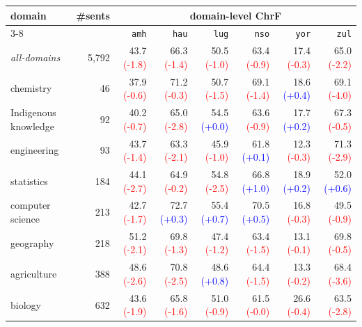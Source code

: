 \begin{table}[t]
\centering
\small
\setlength{\tabcolsep}{4pt}
\renewcommand{\arraystretch}{1.05}
\begin{tabular}{lrrrrrrr}
\toprule
\textbf{domain} & \textbf{\#sents} & \multicolumn{6}{c}{\textbf{domain-level ChrF}} \\
\cmidrule(lr){3-8}
  &       & \texttt{amh} & \texttt{hau} & \texttt{lug} & \texttt{nso} & \texttt{yor} & \texttt{zul} \\
\midrule
\textit{all-domains} & 5{,}792 & 43.7 \textcolor{red}{(-1.8)} & 66.3 \textcolor{red}{(-1.4)} & 50.5 \textcolor{red}{(-1.0)} & 63.4 \textcolor{red}{(-0.9)} & 17.4 \textcolor{red}{(-0.3)} & 65.0 \textcolor{red}{(-2.2)} \\
\midrule
chemistry & 46 & 37.9 \textcolor{red}{(-0.6)} & 71.2 \textcolor{red}{(-0.3)} & 50.7 \textcolor{red}{(-1.5)} & 69.1 \textcolor{red}{(-1.4)} & 18.6 \textcolor{blue}{(+0.4)} & 69.1 \textcolor{red}{(-4.0)} \\
Indigenous knowledge & 92 & 40.2 \textcolor{red}{(-0.7)} & 65.0 \textcolor{red}{(-2.8)} & 54.5 \textcolor{blue}{(+0.0)} & 63.6 \textcolor{red}{(-0.9)} & 17.7 \textcolor{blue}{(+0.2)} & 67.3 \textcolor{red}{(-0.5)} \\
engineering & 93 & 43.7 \textcolor{red}{(-1.4)} & 63.3 \textcolor{red}{(-2.1)} & 45.9 \textcolor{red}{(-1.0)} & 61.8 \textcolor{blue}{(+0.1)} & 12.3 \textcolor{red}{(-0.3)} & 71.3 \textcolor{red}{(-2.9)} \\
statistics & 184 & 44.1 \textcolor{red}{(-2.7)} & 64.9 \textcolor{red}{(-0.2)} & 54.8 \textcolor{red}{(-2.5)} & 66.8 \textcolor{blue}{(+1.0)} & 18.9 \textcolor{blue}{(+0.2)} & 52.0 \textcolor{blue}{(+0.6)} \\
computer science & 213 & 42.7 \textcolor{red}{(-1.7)} & 72.7 \textcolor{blue}{(+0.3)} & 55.4 \textcolor{blue}{(+0.7)} & 70.5 \textcolor{blue}{(+0.5)} & 16.8 \textcolor{red}{(-0.3)} & 49.5 \textcolor{red}{(-0.9)} \\
geography & 218 & 51.2 \textcolor{red}{(-2.1)} & 69.8 \textcolor{red}{(-1.3)} & 47.4 \textcolor{red}{(-1.2)} & 63.4 \textcolor{red}{(-1.5)} & 13.1 \textcolor{red}{(-0.1)} & 69.8 \textcolor{red}{(-0.5)} \\
agriculture & 388 & 48.6 \textcolor{red}{(-2.6)} & 70.8 \textcolor{red}{(-2.5)} & 48.6 \textcolor{blue}{(+0.8)} & 64.4 \textcolor{red}{(-1.5)} & 13.3 \textcolor{red}{(-0.2)} & 68.4 \textcolor{red}{(-3.6)} \\
biology & 632 & 43.6 \textcolor{red}{(-1.9)} & 65.8 \textcolor{red}{(-1.6)} & 51.0 \textcolor{red}{(-0.9)} & 61.5 \textcolor{red}{(-0.0)} & 26.6 \textcolor{red}{(-0.4)} & 63.5 \textcolor{red}{(-2.8)} \\

\end{tabular}
\end{table}
